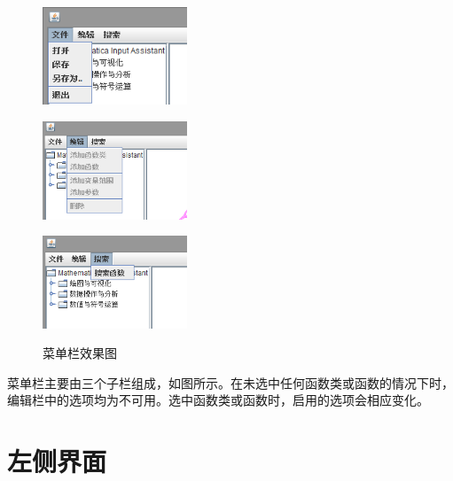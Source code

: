 \documentclass[hyperref, UTF8
,bookmarksnumbered=true, oneside]{ctexbook}
\begin{document}
		\begin{figure}[!h]
			\begin{minipage}[b]{0.3\textwidth}
			\centering
			\includegraphics[width=1.7in]{Menu1.png}
			\label{pic:MathPack}
			\end{minipage}%
			\hspace{0.025\textwidth}%
			\begin{minipage}[b]{0.3\textwidth}
			\centering
			\includegraphics[width=1.7in]{Menu2.png}
			\label{pic:GUIPack}
			\end{minipage}			
			\hspace{0.025\textwidth}%
			\begin{minipage}[b]{0.3\textwidth}
			\centering
			\includegraphics[width=1.7in]{Menu3.png}
			\label{pic:GUIPack}
			\end{minipage}
			\caption{菜单栏效果图}
		\end{figure}

		菜单栏主要由三个子栏组成，如图所示。在未选中任何函数类或函数的情况下时，编辑栏中的选项均为不可用。选中函数类或函数时，启用的选项会相应变化。



	\section{左侧界面} %
\end{document}
